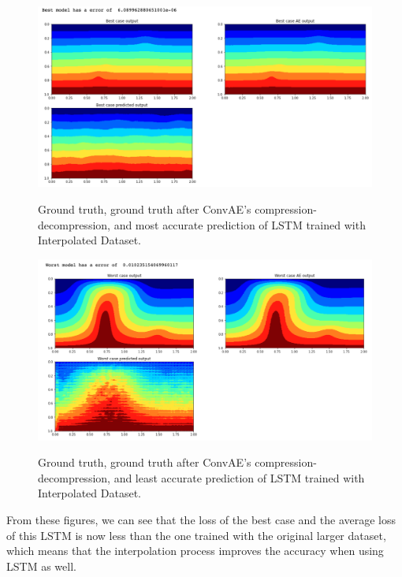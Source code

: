 \begin{figure}[H]
    \caption{Ground truth, ground truth after ConvAE's compression-decompression, and most accurate prediction of LSTM trained with Interpolated Dataset.}
    \includegraphics[scale=0.5]{figures/mantle_convection_images/larger_dataset_interpolated/LSTM_Best.png}
    \label{figure:LSTM_interpolated_best}
\end{figure}

\begin{figure}[H]
    \caption{Ground truth, ground truth after ConvAE's compression-decompression, and least accurate prediction of LSTM trained with Interpolated Dataset.}
    \includegraphics[scale=0.5]{figures/mantle_convection_images/larger_dataset_interpolated/LSTM_Worst.png}
    \label{figure:LSTM_interpolated_worst}
\end{figure}

From these figures, we can see that the loss of the best case and the average loss of this LSTM is now less than the one trained with the original larger dataset, which means that the interpolation process improves the accuracy when using LSTM as well.


